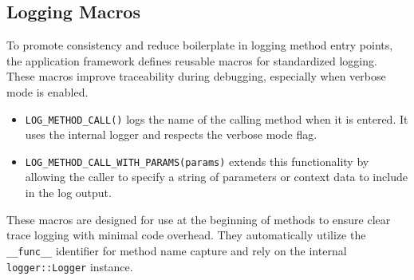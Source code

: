 \subsection*{Logging Macros}
To promote consistency and reduce boilerplate in logging method entry points, the application framework defines reusable macros for standardized logging. These macros improve traceability during debugging, especially when verbose mode is enabled.
\begin{itemize}
    \item \texttt{LOG_METHOD_CALL()} logs the name of the calling method when it is entered. It uses the internal logger and respects the verbose mode flag.
    \item \texttt{LOG_METHOD_CALL_WITH_PARAMS(params)} extends this functionality by allowing the caller to specify a string of parameters or context data to include in the log output.
\end{itemize}
These macros are designed for use at the beginning of methods to ensure clear trace logging with minimal code overhead. They automatically utilize the \texttt{__func__} identifier for method name capture and rely on the internal \texttt{logger::Logger} instance.


